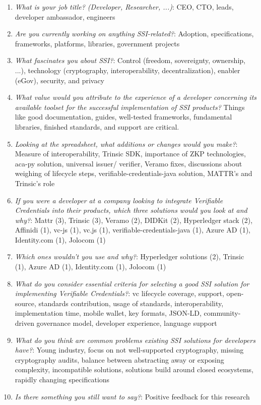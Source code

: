     \begin{enumerate}
        \item \textit{What is your job title? (Developer, Researcher, ...)}: CEO, CTO, leads, developer ambassador, engineers
        \item \textit{Are you currently working on anything SSI-related?}: Adoption, specifications, frameworks, platforms, libraries, government projects   
        \item \textit{What fascinates you about SSI?}: Control (freedom, sovereignty, ownership, ...), technology (cryptography, interoperability, decentralization), enabler (eGov), security, and privacy
        \item \textit{What value would you attribute to the experience of a developer concerning its available toolset for the successful implementation of SSI products?} Things like good documentation, guides, well-tested frameworks, fundamental libraries, finished standards, and support are critical.	
        \item \textit{Looking at the spreadsheet, what additions or changes would you make?}: Measure of interoperability, Trinsic SDK, importance of \ac{ZKP} technologies, aca-py solution, universal issuer/ verifier, Veramo fixes, discussions about weighing of lifecycle steps, verifiable-credentials-java solution, MATTR's and Trinsic's role
        \item \textit{If you were a developer at a company looking to integrate Verifiable Credentials into their products, which three solutions would you look at and why?}:	Mattr (3), Trinsic (3), Veramo (2), DIDKit (2), Hyperledger stack (2), Affinidi (1), vc-js (1), vc.js (1), verifiable-credentials-java (1), Azure AD (1), Identity.com (1), Jolocom (1)	
        \item \textit{Which ones wouldn't you use and why?}: Hyperledger solutions (2), Trinsic (1), Azure AD (1), Identity.com (1), Jolocom (1)
        \item \textit{What do you consider essential criteria for selecting a good SSI solution for implementing Verifiable Credentials?}: \ac{vc} lifecycle coverage, support, open-source, standards contribution, usage of standards, interoperability, implementation time, mobile wallet, key formats, JSON-LD, community-driven governance model, developer experience, language support
        \item \textit{What do you think are common problems existing SSI solutions for developers have?}: Young industry, focus on not well-supported cryptography, missing cryptography audits, balance between abstracting away or exposing complexity, incompatible solutions, solutions build around closed ecosystems, rapidly changing specifications
        \item \textit{Is there something you still want to say?}: Positive feedback for this research
    \end{enumerate}
    
